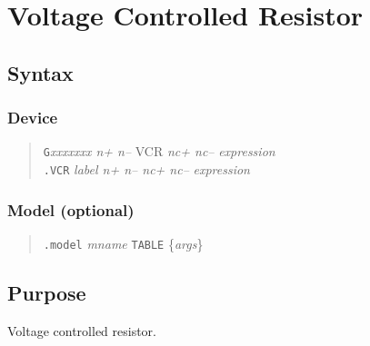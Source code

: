 %
%
%
%
\section{Voltage Controlled Resistor}
\subsection{Syntax}
\subsubsection{Device}
\begin{verse}
{\tt G}{\it xxxxxxx n+ n--} VCR {\it nc+ nc--} {\it expression}\\
{\tt .VCR} {\it label n+ n-- nc+ nc--} {\it expression}
\end{verse}
\subsubsection{Model (optional)}
\begin{verse}
{\tt .model} {\it mname} {\tt TABLE} \{{\it args}\}
\end{verse}
\subsection{Purpose}

Voltage controlled resistor.
